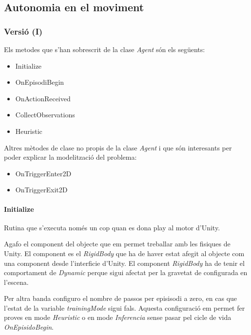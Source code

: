 \documentclass{article}
\begin{document}
    \newpage

    \subsection{ Autonomia en el moviment }
    
    \subsubsection{ Versió (I) }
    
    Els metodes que s'han sobrescrit de la clase \textit{Agent} són els següents:
    
    \begin{itemize}
        \item Initialize
        \item OnEpisodiBegin
        \item OnActionReceived
        \item CollectObservations
        \item Heuristic
    \end{itemize}
    
    Altres mètodes de clase no propis de la clase \textit{Agent} i que són interesants per poder explicar la modelització del problema:
    
    \begin{itemize}
        \item OnTriggerEnter2D
        \item OnTriggerExit2D
    \end{itemize}
    
    \paragraph{Initialize}
    
    Rutina que s'executa només un cop quan es dona play al motor d'Unity.
    
    Agafo el component del objecte que em permet treballar amb les fisiques de Unity. El component es el \textit{RigidBody} que ha de haver estat afegit al objecte com una component desde l'interficie d'Unity. El component \textit{RigidBody} ha de tenir el comportament de \textit{Dynamic} perque sigui afectat per la gravetat de configurada en l'escena.
    
    Per altra banda configuro el nombre de passos per episisodi a zero, en cas que l'estat de la variable \textit{trainingMode} sigui fals. Aquesta configuració em permet fer proves en mode \textit{Heuristic} o en mode \textit{Inferencia} sense pasar pel cicle de vida \textit{OnEpisidoBegin}. 
    
\end{document}
